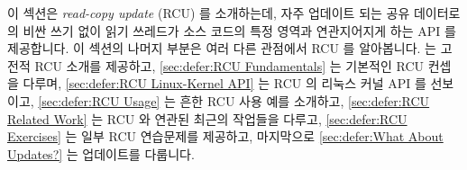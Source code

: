 \fi

이 섹션은 \emph{read-copy update} (RCU) 를 소개하는데, 자주 업데이트 되는 공유
데이터로의 비싼 쓰기 없이 읽기 쓰레드가 소스 코드의 특정 영역과 연관지어지게
하는 API 를 제공합니다.
이 섹션의 나머지 부분은 여러 다른 관점에서 RCU 를 알아봅니다.
 는 고전적 RCU 소개를 제공하고,
\cref{sec:defer:RCU Fundamentals} 는 기본적인 RCU 컨셉을 다루며,
\cref{sec:defer:RCU Linux-Kernel API} 는 RCU 의 리눅스 커널 API 를 선보이고,
\cref{sec:defer:RCU Usage} 는 흔한 RCU 사용 예를 소개하고,
\cref{sec:defer:RCU Related Work} 는 RCU 와 연관된 최근의 작업들을 다루고,
\cref{sec:defer:RCU Exercises} 는 일부 RCU 연습문제를 제공하고, 마지막으로
\cref{sec:defer:What About Updates?} 는 업데이트를 다룹니다.

\iffalse

This section introduces \emph{read-copy update} (RCU), which provides
an API that allows readers to be associated with regions in the source code,
rather than with expensive updates to frequently updated shared data.
The remainder of this
section examines RCU from a number of different perspectives.
\Cref{sec:defer:Introduction to RCU} provides the classic
introduction to RCU,
\cref{sec:defer:RCU Fundamentals} covers fundamental RCU
concepts,
\cref{sec:defer:RCU Linux-Kernel API} presents the Linux-kernel
API,
\cref{sec:defer:RCU Usage} introduces some common RCU use cases,
\cref{sec:defer:RCU Related Work} covers recent work related
to RCU,
\cref{sec:defer:RCU Exercises} provides some RCU exercises,
and finally
\cref{sec:defer:What About Updates?}
discusses updates.

\fi






